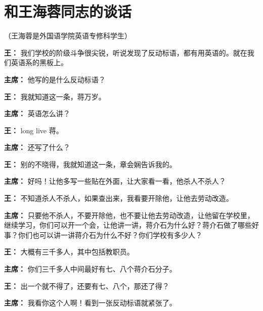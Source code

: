 \section[和王海蓉同志的谈话（一九六四年六月二十四日）]{和王海蓉同志的谈话}


（王海蓉是外国语学院英语专修科学生）

\begin{duihua}

\item[\textbf{王：}] 我们学校的阶级斗争很尖锐，听说发现了反动标语，都有用英语的。就在我们英语系的黑板上。

\item[\textbf{主席：}] 他写的是什么反动标语？

\item[\textbf{王：}] 我就知道这一条，蒋万岁。

\item[\textbf{主席：}] 英语怎么讲？

\item[\textbf{王：}] long live 蒋。

\item[\textbf{主席：}] 还写了什么？

\item[\textbf{王：}] 别的不晓得，我就知道这一条，章会娴告诉我的。

\item[\textbf{主席：}] 好吗！让他多写一些贴在外面，让大家看一看，他杀人不杀人？

\item[\textbf{王：}] 不知道杀人不杀人，如果查出来，我看要开除他，让他去劳动改造。

\item[\textbf{主席：}] 只要他不杀人，不要开除他，也不要让他去劳动改造，让他留在学校里，继续学习，你们可以开一个会，让他讲一讲，蒋介石为什么好？蒋介石做了哪些好事？你们也可以讲一讲蒋介石为什么不好？你们学校有多少人？

\item[\textbf{王：}] 大概有三千多人，其中包括教职员。

\item[\textbf{主席：}] 你们三千多人中间最好有七、八个蒋介石分子。

\item[\textbf{王：}] 出一个就不得了，还要有七、八个，那还了得？

\item[\textbf{主席：}] 我看你这个人啊！看到一张反动标语就紧张了。


\end{duihua}
